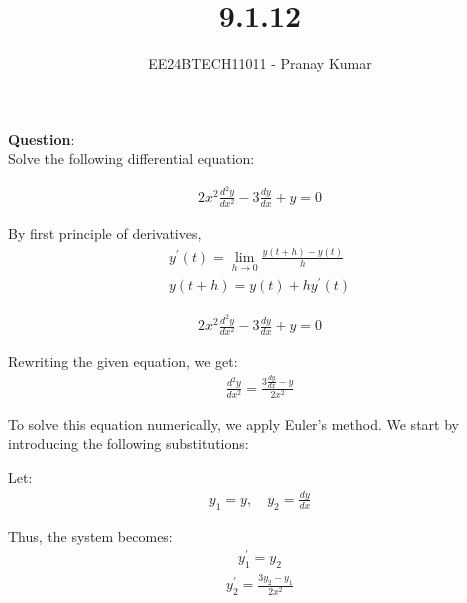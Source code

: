 \documentclass[journal]{IEEEtran}
\begin{document}

\vspace{3cm}

\title{9.1.12}
\author{EE24BTECH11011 - Pranay Kumar}
\maketitle
{\let\newpage\relax\maketitle}

\renewcommand{\thefigure}{\theenumi}
\renewcommand{\thetable}{\theenumi}
\setlength{\intextsep}{10pt} %


\renewcommand{\thetable}{\theenumi}

\textbf{Question}:\\
Solve the following differential equation:

\begin{align}
2x^2 \frac{d^2y}{dx^2} - 3 \frac{dy}{dx} + y = 0
\end{align}
\solution

By first principle of derivatives,
\begin{align}
    y^{\prime}(t) = \lim_{h\to 0}\frac{y(t+h) - y(t)}{h} \\
    y(t+h) = y(t) + hy^{\prime}(t)
\end{align}

\begin{align}
2x^2 \frac{d^2y}{dx^2} - 3 \frac{dy}{dx} + y = 0
\end{align}

Rewriting the given equation, we get:
\begin{align}
\frac{d^2y}{dx^2} = \frac{3 \frac{dy}{dx} - y}{2x^2}
\end{align}

To solve this equation numerically, we apply Euler's method. We start by introducing the following substitutions:

Let:
\begin{align}
y_1 = y, \quad y_2 = \frac{dy}{dx}
\end{align}

Thus, the system becomes:
\begin{align}
y_1^\prime = y_2
\end{align}
\begin{align}
y_2^\prime = \frac{3y_2 - y_1}{2x^2}
\end{align}
\end{document}
